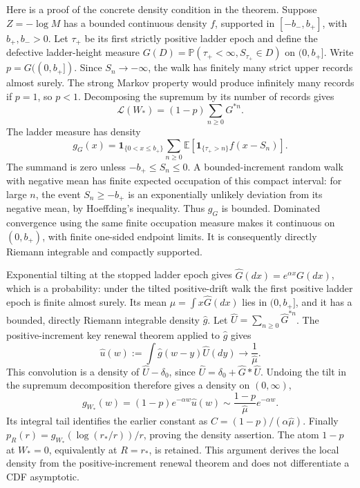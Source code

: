 Here is a proof of the concrete density condition in the theorem.
Suppose \(Z=-\log M\) has a bounded continuous density \(f\), supported
in \([-b_-,b_+]\), with \(b_+,b_->0\). Let \(\tau_+\) be its first
strictly positive ladder epoch and define the defective ladder-height
measure \(G(D)=\mathbb P(\tau_+<\infty,S_{\tau_+}\in D)\) on
\((0,b_+]\). Write \(p=G((0,b_+])\). Since \(S_n\to-\infty\), the
walk has finitely many strict upper records almost surely. The strong
Markov property would produce infinitely many records if \(p=1\), so
\(p<1\). Decomposing the supremum by its number of records gives
\[
 \mathcal L(W_*)=(1-p)\sum_{n\ge0}G^{*n}.
\]
The ladder measure has density
\[
 g_G(x)=\mathbf1_{\{0<x\le b_+\}}
   \sum_{n\ge0}\mathbb E[
      \mathbf1_{\{\tau_+>n\}}f(x-S_n)].
\]
The summand is zero unless \(-b_+\le S_n\le0\). A bounded-increment
random walk with negative mean has finite expected occupation of this
compact interval: for large \(n\), the event \(S_n\ge-b_+\) is an
exponentially unlikely deviation from its negative mean, by Hoeffding's
inequality. Thus \(g_G\) is bounded. Dominated convergence using the
same finite occupation measure makes it continuous on \((0,b_+)\),
with finite one-sided endpoint limits. It is consequently directly
Riemann integrable and compactly supported.

Exponential tilting at the stopped ladder epoch gives
\(\widehat G(dx)=e^{\alpha x}G(dx)\), which is a probability: under
the tilted positive-drift walk the first positive ladder epoch is finite
almost surely. Its mean \(\widehat\mu=\int x\widehat G(dx)\) lies
in \((0,b_+]\), and it has a bounded, directly Riemann integrable
density \(\widehat g\). Let
\(\widehat U=\sum_{n\ge0}\widehat G^{*n}\). The positive-increment
key renewal theorem applied to \(\widehat g\) gives
\[
 \widehat u(w):=\int\widehat g(w-y)\widehat U(dy)
       \longrightarrow\frac1{\widehat\mu}.
\]
This convolution is a density of \(\widehat U-\delta_0\), since
\(\widehat U=\delta_0+\widehat G*\widehat U\). Undoing the tilt
in the supremum decomposition therefore gives a density on \((0,\infty)\),
\[
 g_{W_*}(w)=(1-p)e^{-\alpha w}\widehat u(w)
 \sim\frac{1-p}{\widehat\mu}e^{-\alpha w}.
\]
Its integral tail identifies the earlier constant as
\(C=(1-p)/(\alpha\widehat\mu)\). Finally
\(p_R(r)=g_{W_*}(\log(r_*/r))/r\), proving the density assertion.
The atom \(1-p\) at \(W_*=0\), equivalently at \(R=r_*\), is retained.
This argument derives the local density from the positive-increment
renewal theorem and does not differentiate a CDF asymptotic.

